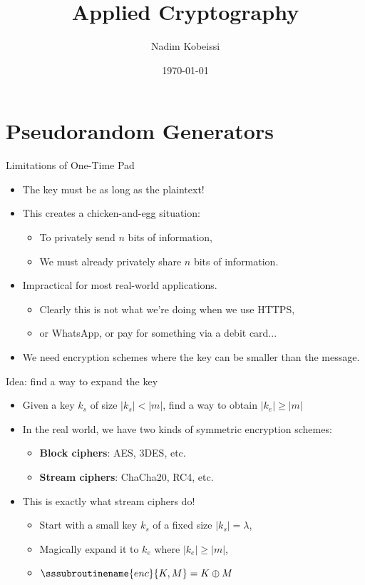 \documentclass[aspectratio=169, lualatex, handout]{beamer}
\title{Applied Cryptography}
\author{Nadim Kobeissi}
\institute{American University of Beirut}
\date{\today}
\begin{document}
\begin{frame}[plain]
	\titlepage
\end{frame}

\section{Pseudorandom Generators}

\begin{frame}{Limitations of One-Time Pad}
	\begin{itemize}[<+->]
		\item The key must be as long as the plaintext!
		\item This creates a chicken-and-egg situation:
		      \begin{itemize}[<+->]
			      \item To privately send $n$ bits of information,
			      \item We must already privately share $n$ bits of information.
		      \end{itemize}
		\item Impractical for most real-world applications.
		      \begin{itemize}[<+->]
			      \item Clearly this is not what we're doing when we use HTTPS,
			      \item or WhatsApp, or pay for something via a debit card...
		      \end{itemize}
		\item We need encryption schemes where the key can be smaller than the message.
	\end{itemize}
\end{frame}

\begin{frame}{Idea: find a way to expand the key}
	\begin{itemize}[<+->]
		\item Given a key $k_s$ of size $\left|k_s\right| < \left|m\right|$, find a way to obtain $\left|k_e\right| \geq \left|m\right|$
		\item In the real world, we have two kinds of symmetric encryption schemes:
		      \begin{itemize}[<+->]
			      \item \textbf{Block ciphers}: AES, 3DES, etc.
			      \item \textbf{Stream ciphers}: ChaCha20, RC4, etc.
		      \end{itemize}
		\item This is exactly what stream ciphers do!
		      \begin{itemize}[<+->]
			      \item Start with a small key $k_s$ of a fixed size $\left|k_s\right| = \lambda$,
			      \item Magically expand it to $k_e$ where $\left|k_e\right| \geq \left|m\right|$,
			      \item $\sssubroutinename{enc}{K, M} = K \oplus M$
		      \end{itemize}
	\end{itemize}
\end{frame}
\end{document}
